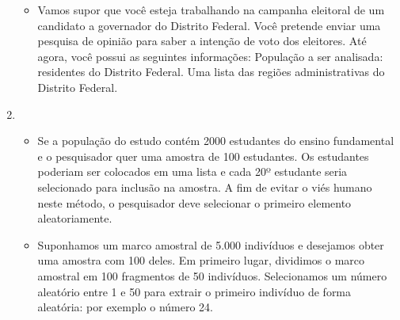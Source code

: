 \begin{question}
\begin{enumerate}[label={\textbf{\alph*)}}]
\begin{itemize}
            \item Vamos supor que você esteja trabalhando na campanha eleitoral de um candidato a governador do Distrito Federal. Você pretende enviar
            uma pesquisa de opinião para saber a intenção de voto dos eleitores. Até agora, você possui as seguintes informações: População a ser analisada: residentes do Distrito Federal.
            Uma lista das regiões administrativas do Distrito Federal.
        \end{itemize}
        \item 
        
        \begin{itemize}
            \item Se a população do estudo contém 2000 estudantes do ensino fundamental e o pesquisador quer uma amostra de 100 estudantes. Os estudantes
            poderiam ser colocados em uma lista e cada 20º estudante seria selecionado para inclusão na amostra. A fim de evitar o viés humano neste método,
            o pesquisador deve selecionar o primeiro elemento aleatoriamente. 

            \item Suponhamos um marco amostral de 5.000 indivíduos e desejamos obter uma amostra com 100 deles. Em primeiro lugar, dividimos o marco amostral
            em 100 fragmentos de 50 indivíduos. Selecionamos um número aleatório entre 1 e 50 para extrair o primeiro indivíduo de forma aleatória: por exemplo
            o número 24.
        \end{itemize}

    \end{enumerate}
\end{question}